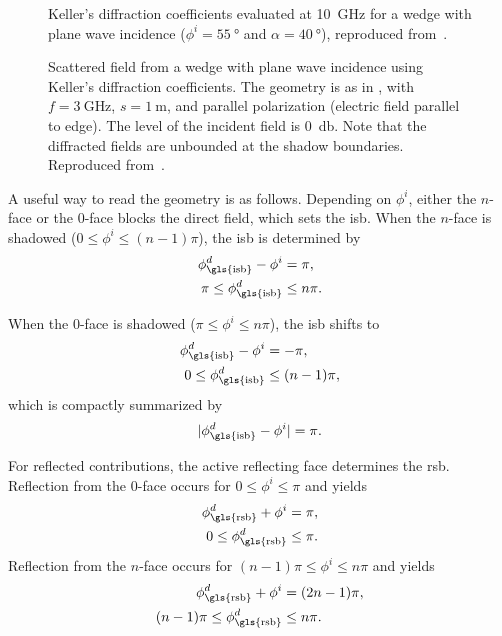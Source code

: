 \begin{figure}
  \centering
  \caption{Keller's diffraction coefficients evaluated at \qty{10}{\giga\hertz} for a wedge with plane wave incidence ($\phi^i = \qty{55}{\degree}$ and $\alpha = \qty{40}{\degree}$), reproduced from~\cite[Fig.~4.10]{McNamara1990}.}
\end{figure}

\begin{figure}
  \centering
  \caption{Scattered field from a wedge with plane wave incidence using Keller's diffraction coefficients. The geometry is as in , with $f = \qty{3}{\giga\hertz}$, $s = \qty{1}{\meter}$, and parallel polarization (electric field parallel to edge). The level of the incident field is \qty{0}{\decibel}. Note that the diffracted fields are unbounded at the shadow boundaries. Reproduced from~\cite[Fig.~4.11]{McNamara1990}.}
\end{figure}

A useful way to read the geometry is as follows. Depending on $\phi^i$, either the $n$-face or the 0-face blocks the direct field, which sets the \gls{isb}. When the $n$-face is shadowed ($0\leq\phi^i\leq(n-1)\pi$), the \gls{isb} is determined by
\begin{align}
  \phi_\text{\gls{isb}}^d - \phi^i &= \pi, \\
  \pi \leq \phi_\text{\gls{isb}}^d &\leq n\pi.
\end{align}

When the 0-face is shadowed ($\pi\leq\phi^i\leq n\pi$), the \gls{isb} shifts to
\begin{align}
  \phi_\text{\gls{isb}}^d - \phi^i &= -\pi, \\
  0 \leq \phi_\text{\gls{isb}}^d &\leq (n - 1)\pi,
\end{align}
which is compactly summarized by
\begin{equation}
  |\phi_\text{\gls{isb}}^d - \phi^i| = \pi.
\end{equation}

For reflected contributions, the active reflecting face determines the \gls{rsb}. Reflection from the 0-face occurs for $0\leq\phi^i\leq\pi$ and yields
\begin{align}
  \phi_\text{\gls{rsb}}^d + \phi^i &= \pi, \\
  0 \leq \phi_\text{\gls{rsb}}^d &\leq \pi.
\end{align}
Reflection from the $n$-face occurs for $(n-1)\pi\leq\phi^i\leq n\pi$ and yields
\begin{align}
  \phi_\text{\gls{rsb}}^d + \phi^i &= (2n - 1)\pi, \\
  (n - 1)\pi \leq \phi_\text{\gls{rsb}}^d &\leq n\pi.
\end{align}

